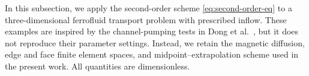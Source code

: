\documentclass[11pt,a4paper]{article}
\newcommand{\bs}{\boldsymbol}
\theoremstyle{definition}
\numberwithin{equation}{section}
\begin{document}
In this subsection, we apply the second-order scheme
\eqref{eq:second-order-eq} to a three-dimensional ferrofluid transport
problem with prescribed inflow. 
%
These examples are inspired by the channel-pumping tests in
Dong et al.~\cite{DongHuangHuangYang2026}, but it does not reproduce
their parameter settings. Instead, we retain the magnetic diffusion,
edge and face finite element spaces, and midpoint--extrapolation scheme
used in the present work. All quantities are
dimensionless.


\end{document}
